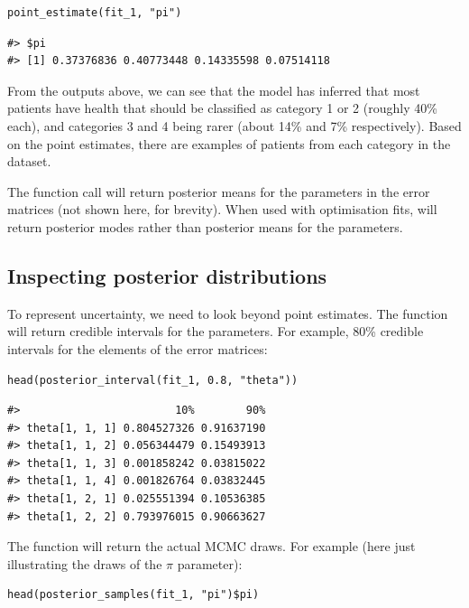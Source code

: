 \begin{verbatim}
point_estimate(fit_1, "pi")
\end{verbatim}

\begin{verbatim}
#> $pi
#> [1] 0.37376836 0.40773448 0.14335598 0.07514118
\end{verbatim}

From the outputs above, we can see that the model has inferred that most
patients have health that should be classified as category 1 or 2 (roughly 40\%
each), and categories 3 and 4 being rarer (about 14\% and 7\% respectively).
Based on the point estimates, there are examples of patients from each category
in the dataset.

The function call  will return posterior
means for the parameters in the error matrices (not shown here, for brevity).
When used with optimisation fits,  will return
posterior modes rather than posterior means for the parameters.

\hypertarget{inspecting-posterior-distributions}{%
\subsection{Inspecting posterior distributions}\label{inspecting-posterior-distributions}}

To represent uncertainty, we need to look beyond point estimates. The function
 will return credible intervals for the parameters.
For example, 80\% credible intervals for the elements of the error matrices:

\begin{verbatim}
head(posterior_interval(fit_1, 0.8, "theta"))
\end{verbatim}

\begin{verbatim}
#>                        10%        90%
#> theta[1, 1, 1] 0.804527326 0.91637190
#> theta[1, 1, 2] 0.056344479 0.15493913
#> theta[1, 1, 3] 0.001858242 0.03815022
#> theta[1, 1, 4] 0.001826764 0.03832445
#> theta[1, 2, 1] 0.025551394 0.10536385
#> theta[1, 2, 2] 0.793976015 0.90663627
\end{verbatim}

The function  will return the actual MCMC draws. For
example (here just illustrating the draws of the \(\pi\) parameter):

\begin{verbatim}
head(posterior_samples(fit_1, "pi")$pi)
\end{verbatim}

